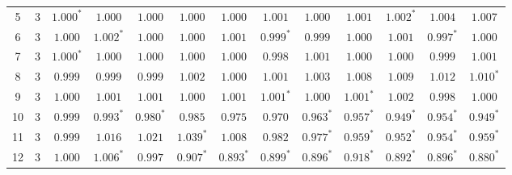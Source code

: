 \begin{table}[p]
\begin{tabular}{ccccccccccccc}
5 & 3 & $1.000^{*}$ & $1.000$ & $1.000$ & $1.000$ & $1.000$ & $1.001$ & $1.000$ & $1.001$ & $1.002^{*}$ & $1.004$ & $1.007$ \\
6 & 3 & $1.000$ & $1.002^{*}$ & $1.000$ & $1.000$ & $1.001$ & $0.999^{*}$ & $0.999$ & $1.000$ & $1.001$ & $0.997^{*}$ & $1.000$ \\
7 & 3 & $1.000^{*}$ & $1.000$ & $1.000$ & $1.000$ & $1.000$ & $0.998$ & $1.001$ & $1.000$ & $1.000$ & $0.999$ & $1.001$ \\
8 & 3 & $0.999$ & $0.999$ & $0.999$ & $1.002$ & $1.000$ & $1.001$ & $1.003$ & $1.008$ & $1.009$ & $1.012$ & $1.010^{*}$ \\
9 & 3 & $1.000$ & $1.001$ & $1.001$ & $1.000$ & $1.001$ & $1.001^{*}$ & $1.000$ & $1.001^{*}$ & $1.002$ & $0.998$ & $1.000$ \\
10 & 3 & $0.999$ & $0.993^{*}$ & $0.980^{*}$ & $0.985$ & $0.975$ & $0.970$ & $0.963^{*}$ & $0.957^{*}$ & $0.949^{*}$ & $0.954^{*}$ & $0.949^{*}$ \\
11 & 3 & $0.999$ & $1.016$ & $1.021$ & $1.039^{*}$ & $1.008$ & $0.982$ & $0.977^{*}$ & $0.959^{*}$ & $0.952^{*}$ & $0.954^{*}$ & $0.959^{*}$ \\
12 & 3 & $1.000$ & $1.006^{*}$ & $0.997$ & $0.907^{*}$ & $0.893^{*}$ & $0.899^{*}$ & $0.896^{*}$ & $0.918^{*}$ & $0.892^{*}$ & $0.896^{*}$ & $0.880^{*}$ \\
\bottomrule
\end{tabular}
\end{table}
